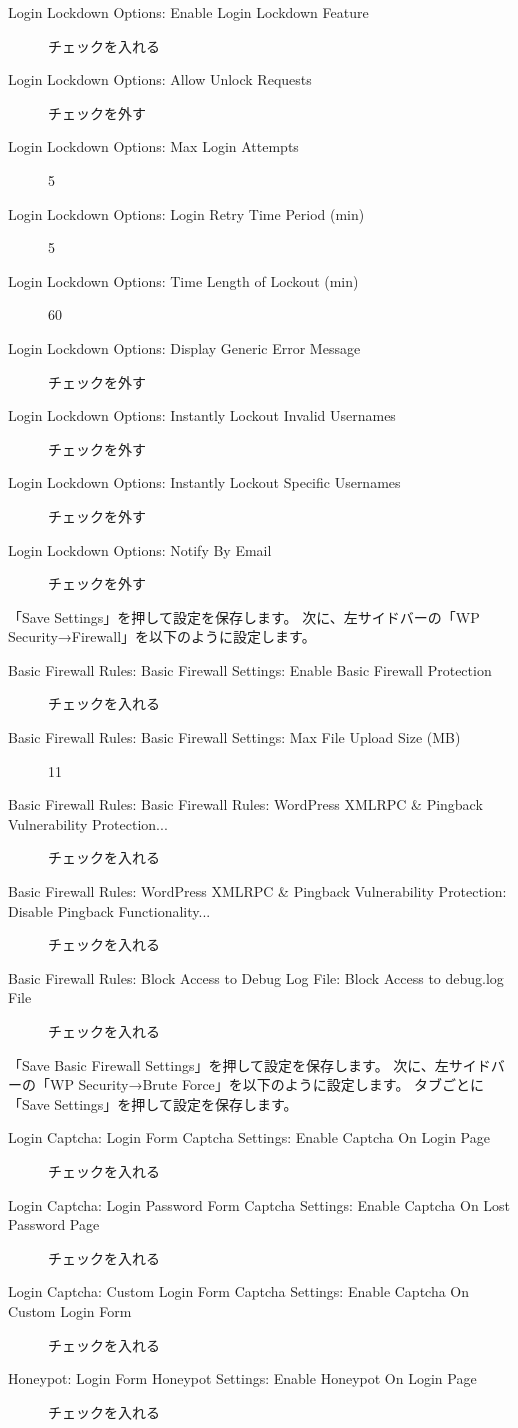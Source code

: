 \documentclass[titlepage,10pt,a4paper,uplatex]{jsbook}
\begin{document}
\begin{description}
\item[Login Lockdown Options: Enable Login Lockdown Feature] チェックを入れる
\item[Login Lockdown Options: Allow Unlock Requests] チェックを外す
\item[Login Lockdown Options: Max Login Attempts] 5
\item[Login Lockdown Options: Login Retry Time Period (min)] 5
\item[Login Lockdown Options: Time Length of Lockout (min)] 60
\item[Login Lockdown Options: Display Generic Error Message] チェックを外す
\item[Login Lockdown Options: Instantly Lockout Invalid Usernames] チェックを外す
\item[Login Lockdown Options: Instantly Lockout Specific Usernames] チェックを外す
\item[Login Lockdown Options: Notify By Email] チェックを外す
\end{description}

「Save Settings」を押して設定を保存します。
次に、左サイドバーの「WP Security→Firewall」を以下のように設定します。

\begin{description}
\item[Basic Firewall Rules: Basic Firewall Settings: Enable Basic Firewall Protection] チェックを入れる
\item[Basic Firewall Rules: Basic Firewall Settings: Max File Upload Size (MB)] 11
\item[Basic Firewall Rules: Basic Firewall Rules: WordPress XMLRPC \& Pingback Vulnerability Protection...] チェックを入れる
\item[Basic Firewall Rules: WordPress XMLRPC \& Pingback Vulnerability Protection: Disable Pingback Functionality...] チェックを入れる
\item[Basic Firewall Rules: Block Access to Debug Log File: Block Access to debug.log File] チェックを入れる
\end{description}

「Save Basic Firewall Settings」を押して設定を保存します。
次に、左サイドバーの「WP Security→Brute Force」を以下のように設定します。
タブごとに「Save Settings」を押して設定を保存します。

\begin{description}
\item[Login Captcha: Login Form Captcha Settings: Enable Captcha On Login Page] チェックを入れる
\item[Login Captcha: Login Password Form Captcha Settings: Enable Captcha On Lost Password Page] チェックを入れる
\item[Login Captcha: Custom Login Form Captcha Settings: Enable Captcha On Custom Login Form] チェックを入れる
\item[Honeypot: Login Form Honeypot Settings: Enable Honeypot On Login Page] チェックを入れる
\end{description}
\end{document}
